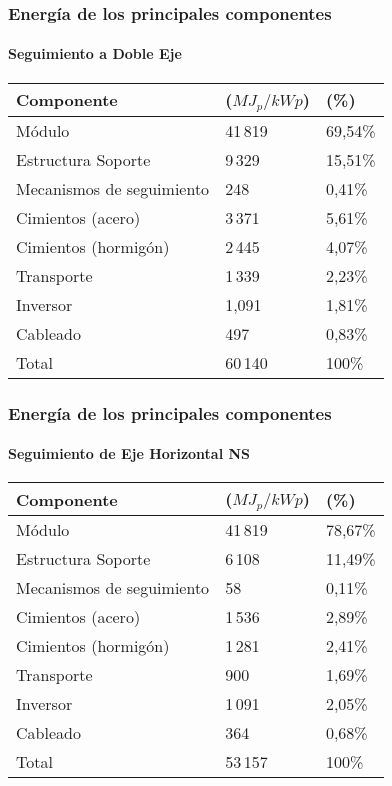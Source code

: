 \documentclass[serif, xcolor=dvipsnames]{beamer}
\begin{document}
\begin{frame}
  \frametitle{Energía de los principales componentes}
  \framesubtitle{Seguimiento a Doble Eje}
  \begin{tabular}{lll}
    \toprule
    Componente              &  ($MJ_{p}/kWp$)  &  (\%)     \\
    \midrule
    Módulo & 41\,819 & 69,54\% \\
    Estructura Soporte      &  9\,329          &  15,51\%  \\
    Mecanismos de seguimiento    &  248             &  0,41\%   \\
    Cimientos (acero)     &  3\,371          &  5,61\%   \\
    Cimientos (hormigón)  &  2\,445          &  4,07\%   \\
    Transporte              &  1\,339          &  2,23\%   \\
    Inversor               &  1,091           &  1,81\%   \\
    Cableado                 &  497             &  0,83\%   \\
    \midrule
    Total                  &  60\,140         &  100\%    \\
    \bottomrule
  \end{tabular}

\end{frame}

\begin{frame}
  \frametitle{Energía de los principales componentes}
  \framesubtitle{Seguimiento de Eje Horizontal NS}
  \begin{tabular}{lll}
    \toprule
    Componente              &  ($MJ_{p}/kWp$)  &  (\%)     \\
    \midrule
    Módulo & 41\,819 & 78,67\% \\
    Estructura Soporte      &  6\,108          &  11,49\%  \\
    Mecanismos de seguimiento    &  58              &  0,11\%   \\
    Cimientos (acero)     &  1\,536          &  2,89\%   \\
    Cimientos (hormigón)  &  1\,281          &  2,41\%   \\
    Transporte              &  900             &  1,69\%   \\
    Inversor               &  1\,091          &  2,05\%   \\
    Cableado                 &  364             &  0,68\%   \\
    \midrule
    Total                  &  53\,157         &  100\%    \\
    \bottomrule
  \end{tabular}
\end{frame}
\end{document}
